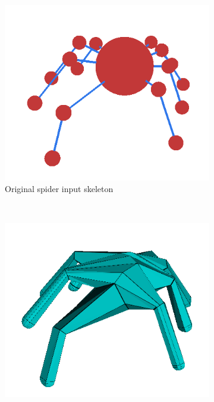 \begin{figure}
        \centering
        \begin{subfigure}[b]{0.4\textwidth}
                \includegraphics[width=\textwidth]{images/pavuk_kostra.png}
                \caption{Original spider input skeleton}
                \label{fig:pavuk_skl_1}
        \end{subfigure}%
        ~ %
        \begin{subfigure}[b]{0.4\textwidth}
                \includegraphics[width=\textwidth]{images/pavuk_fail.png}

\end{subfigure}
\end{figure}
